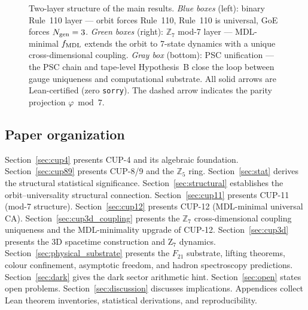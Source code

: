 \documentclass[11pt]{article}
\theoremstyle{remark}
\begin{document}
\begin{figure}[htbp]
\caption{Two-layer structure of the main results. \emph{Blue boxes} (left): binary Rule~110 layer --- orbit forces Rule~110, Rule~110 is universal, GoE forces $N_{\rm gen}=3$. \emph{Green boxes} (right): $\mathbb{Z}_7$ mod-7 layer --- MDL-minimal $f_{\rm MDL}$ extends the orbit to 7-state dynamics with a unique cross-dimensional coupling. \emph{Gray box} (bottom): PSC unification --- the PSC chain and tape-level Hypothesis~B close the loop between gauge uniqueness and computational substrate. All solid arrows are Lean-certified (zero \texttt{sorry}). The dashed arrow indicates the parity projection $\varphi \bmod 7$.}
\label{fig:two_layer}
\end{figure}

\subsection{Paper organization}

Section~\ref{sec:cup4} presents CUP-4 and its algebraic foundation.
Section~\ref{sec:cup89} presents CUP-8/9 and the $\mathbb{Z}_5$ ring.
Section~\ref{sec:stat} derives the structural statistical significance.
Section~\ref{sec:structural} establishes the orbit--universality structural connection.
Section~\ref{sec:cup11} presents CUP-11 (mod-7 structure).
Section~\ref{sec:cup12} presents CUP-12 (MDL-minimal universal CA).
Section~\ref{sec:cup3d_coupling} presents the $\mathbb{Z}_7$ cross-dimensional coupling
uniqueness and the MDL-minimality upgrade of CUP-12.
Section~\ref{sec:cup3d} presents the 3D spacetime construction and Z$_7$ dynamics.
Section~\ref{sec:physical_substrate} presents the $F_{21}$ substrate, lifting theorems,
colour confinement, asymptotic freedom, and hadron spectroscopy predictions.
Section~\ref{sec:dark} gives the dark sector arithmetic hint.
Section~\ref{sec:open} states open problems.
Section~\ref{sec:discussion} discusses implications.
Appendices collect Lean theorem inventories, statistical derivations, and reproducibility.
\end{document}
